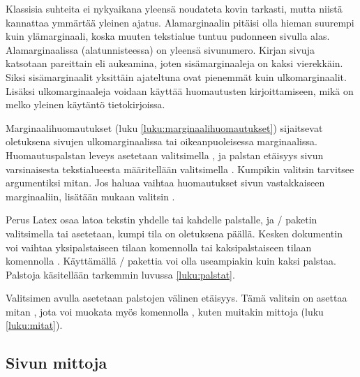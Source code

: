 \begin{koodilohkosis}
\geometry{hmarginratio=17:28, vmarginratio=20:32}
\end{koodilohkosis}

Klassisia suhteita ei nykyaikana yleensä noudateta kovin tarkasti, mutta
niistä kannattaa ymmärtää yleinen ajatus. Alamarginaalin pitäisi olla
hieman suurempi kuin ylämarginaali, koska muuten tekstialue tuntuu
pudonneen sivulla alas. Alamarginaalissa (alatunnisteessa) on yleensä
sivunumero. Kirjan sivuja katsotaan pareittain eli aukeamina, joten
sisämarginaaleja on kaksi vierekkäin. Siksi sisämarginaalit yksittäin
ajateltuna ovat pienemmät kuin ulkomarginaalit. Lisäksi ulkomarginaaleja
voidaan käyttää huomautusten kirjoittamiseen, mikä on melko yleinen
käytäntö tietokirjoissa.

Marginaalihuomautukset (luku \ref{luku:marginaalihuomautukset})
sijaitsevat oletuksena sivujen ulkomarginaalissa tai oikeanpuoleisessa
marginaalissa. Huomautuspalstan leveys asetetaan valitsimella
, ja palstan etäisyys sivun varsinaisesta
tekstialueesta määritellään valitsimella . Kumpikin
valitsin tarvitsee argumentiksi mitan. Jos haluaa vaihtaa huomautukset
sivun vastakkaiseen marginaaliin, lisätään mukaan valitsin
.

Perus Latex osaa latoa tekstin yhdelle tai kahdelle palstalle, ja
\-/ paketin valitsimella  tai
 asetetaan, kumpi tila on oletuksena päällä. Kesken
dokumentin voi vaihtaa yksipalstaiseen tilaan komennolla
 tai kaksipalstaiseen tilaan komennolla
. Käyttämällä \-/
pakettia voi olla useampiakin kuin kaksi palstaa.
Palstoja käsitellään tarkemmin luvussa \ref{luku:palstat}.

Valitsimen  avulla asetetaan palstojen välinen
etäisyys. Tämä valitsin on asettaa mitan , jota voi
muokata myös komennolla , kuten muitakin mittoja
(luku \ref{luku:mitat}).

\subsection{Sivun mittoja}


